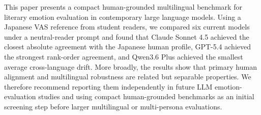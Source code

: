 This paper presents a compact human-grounded multilingual benchmark for literary emotion evaluation in contemporary large language models. Using a Japanese VAS reference from student readers, we compared six current models under a neutral-reader prompt and found that Claude Sonnet 4.5 achieved the closest absolute agreement with the Japanese human profile, GPT-5.4 achieved the strongest rank-order agreement, and Qwen3.6 Plus achieved the smallest average cross-language drift. More broadly, the results show that primary human alignment and multilingual robustness are related but separable properties. We therefore recommend reporting them independently in future LLM emotion-evaluation studies and using compact human-grounded benchmarks as an initial screening step before larger multilingual or multi-persona evaluations.
